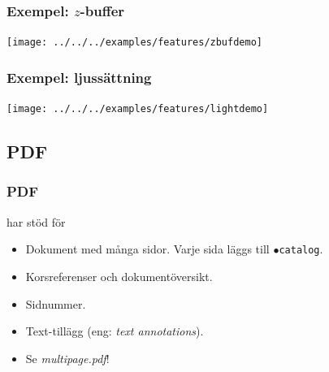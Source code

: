 \documentclass[noamsthm,handout]{beamer}
\newcommand{\inEnglish}[1]{(eng: \emph{#1})}
\begin{document}
\begin{frame}\frametitle{Exempel: $z$-buffer}
  \begin{center}
    \texttt{[image: ../../../examples/features/zbufdemo]}
  \end{center}
\end{frame}
{
\begin{frame}\frametitle{Exempel: ljussättning}
  \begin{center}
    \texttt{[image: ../../../examples/features/lightdemo]}
  \end{center}
\end{frame}
}
\subsection{PDF}
\begin{frame}\frametitle{PDF}
  \Shapes har stöd för
  \begin{itemize}
  \item Dokument med många sidor.  Varje sida läggs till \texttt{$\bullet$catalog}.
  \item Korsreferenser och dokumentöversikt.
  \item Sidnummer.
  \item Text-tillägg \inEnglish{text annotations}.
  \item Se \emph{multipage.pdf}!
  \end{itemize}
\end{frame}
\end{document}
